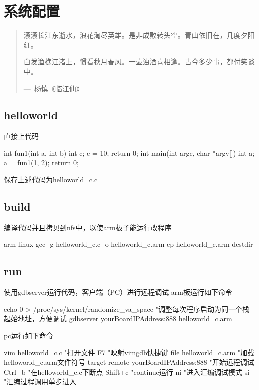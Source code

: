 \chapter{系统配置}

\begin{quotation}
滚滚长江东逝水，浪花淘尽英雄。是非成败转头空。青山依旧在，几度夕阳红。

白发渔樵江渚上，惯看秋月春风。一壶浊酒喜相逢。古今多少事，都付笑谈中。
\begin{flushright}
---~杨慎《临江仙》
\end{flushright}
\end{quotation}

\section{helloworld}
直接上代码
\begin{code}
int fun1(int a, int b)
{
    int c;
    c = 10;
    return 0;
}
int main(int argc, char *argv[])
{
    int a;
    a = fun1(1, 2);
    return 0;
}
\end{code}
保存上述代码为helloworld\_c.c

\section{build}
编译代码并且拷贝到nfs中，以使arm板子能运行改程序
\begin{code}
arm-linux-gcc -g helloworld_c.c -o helloworld_c.arm
cp helloworld_c.arm destdir
\end{code}

\section{run}
使用gdbserver运行代码，客户端（PC）进行远程调试
arm板运行如下命令
\begin{code}
echo 0 > /proc/sys/kernel/randomize_va_space "调整每次程序启动为同一个栈起始地址，方便调试
gdbserver yourBoardIPAddress:888 helloworld_c.arm
\end{code}
pc运行如下命令
\begin{code}
vim helloworld_c.c "打开文件
F7 "映射vimgdb快捷键
file helloworld_c.arm "加载helloworld_c.arm文件符号
target remote yourBoardIPAddress:888 "开始远程调试
Ctrl+b "在helloworld_c.c下断点
Shift+c "continue运行
ni "进入汇编调试模式
si "汇编过程调用单步进入
\end{code}


